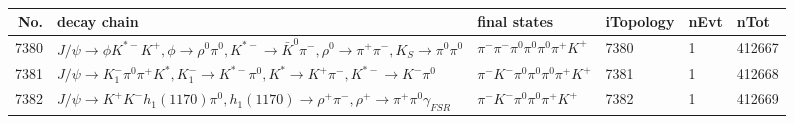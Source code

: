 \begin{table}[htbp] 
\begin{center}
\begin{small}
\begin{tabular}{rlllll}\hline\hline
 No. & decay chain & final states &  iTopology & nEvt & nTot \\\hline
7380&$J/\psi       \rightarrow \phi           K^{*-}         K^{+}          , \phi            \rightarrow \rho^{0}      \pi^{0}        , K^{*-}          \rightarrow \bar{K}^{0}   \pi^{-}        , \rho^{0}       \rightarrow \pi^{+}        \pi^{-}        , K_{S}           \rightarrow \pi^{0}        \pi^{0}        $&$\pi^{-}        \pi^{-}        \pi^{0}        \pi^{0}        \pi^{0}        \pi^{+}        K^{+}          $& 7380&    1&412667\\
7381&$J/\psi       \rightarrow K_{1}^{-}      \pi^{0}        \pi^{+}        K^{*}          , K_{1}^{-}       \rightarrow K^{*-}         \pi^{0}        , K^{*}           \rightarrow K^{+}          \pi^{-}        , K^{*-}          \rightarrow K^{-}          \pi^{0}        $&$\pi^{-}        K^{-}          \pi^{0}        \pi^{0}        \pi^{0}        \pi^{+}        K^{+}          $& 7381&    1&412668\\
7382&$J/\psi       \rightarrow K^{+}          K^{-}          h_{1}(1170)    \pi^{0}        , h_{1}(1170)     \rightarrow \rho^{+}      \pi^{-}        , \rho^{+}       \rightarrow \pi^{+}        \pi^{0}        \gamma_{FSR} $&$\pi^{-}        K^{-}          \pi^{0}        \pi^{0}        \pi^{+}        K^{+}          $& 7382&    1&412669\\

\hline\hline
\end{tabular}
\end{small}
\caption{ }
\end{center}
\end{table}

